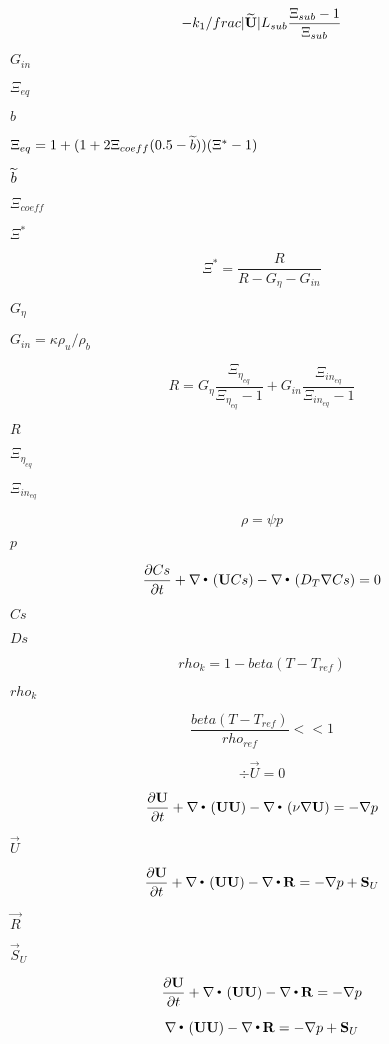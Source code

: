\documentclass{article}
\begin{document}
\[
    - k_{1} /frac{\vert \widetilde{\mathbf U} \vert}{L_{sub}}
    \frac{\Xi_{sub}-1}{\Xi_{sub}}
\]
\pagebreak

$ G_{in} $
\pagebreak

$\Xi_{eq}$
\pagebreak

$ b $
\pagebreak

$\Xi_{eq} = 1 + (1 + 2\Xi_{coeff}(0.5 - \widetilde{b}))(\Xi^* - 1)$
\pagebreak

$ \widetilde{b} $
\pagebreak

$ \Xi_{coeff} $
\pagebreak

$ \Xi^* $
\pagebreak

\[
        \Xi^* = \frac {R}{R - G_\eta - G_{in}}
    \]
\pagebreak

$ G_\eta $
\pagebreak

$ G_{in} = \kappa \rho_{u}/\rho_{b} $
\pagebreak

\[
        R = G_\eta \frac{\Xi_{\eta_{eq}}}{\Xi_{\eta_{eq}} - 1}
          + G_{in} \frac{\Xi_{{in}_{eq}}}{\Xi_{{in}_{eq}} - 1}
    \]
\pagebreak

$ R $
\pagebreak

$ \Xi_{\eta_{eq}} $
\pagebreak

$ \Xi_{{in}_{eq}} $
\pagebreak

\[
    \rho = \psi p
\]
\pagebreak

$        p     $
\pagebreak

\[
    \frac{\partial Cs}{\partial t } + \nabla\,{\scriptscriptstyle \stackrel{\bullet}{{}}}\, \left(\mathbf U Cs\right) - \nabla\,{\scriptscriptstyle \stackrel{\bullet}{{}}}\, \left(D_T \nabla Cs \right)
    = 0
\]
\pagebreak

$        Cs      $
\pagebreak

$        Ds      $
\pagebreak

\[
    rho_{k} = 1 - beta(T - T_{ref})
\]
\pagebreak

$ rho_{k} $
\pagebreak

\[
    \frac{beta(T - T_{ref})}{rho_{ref}} << 1
\]
\pagebreak

\[
        \div \vec{U} = 0
    \]
\pagebreak

\[
        \frac{\partial \mathbf U}{\partial t }
      + \nabla\,{\scriptscriptstyle \stackrel{\bullet}{{}}}\, \left( \mathbf U \mathbf U \right)
      - \nabla\,{\scriptscriptstyle \stackrel{\bullet}{{}}}\, \left(\nu \nabla \mathbf U \right)
      = - \nabla p
    \]
\pagebreak

$        \vec{U} $
\pagebreak

\[
        \frac{\partial \mathbf U}{\partial t } + \nabla\,{\scriptscriptstyle \stackrel{\bullet}{{}}}\, \left( \mathbf U \mathbf U \right) - \nabla\,{\scriptscriptstyle \stackrel{\bullet}{{}}}\, \mbox{\boldmath$\bf R$}
      = - \nabla p + \mathbf S_U
    \]
\pagebreak

$        \vec{R} $
\pagebreak

$        \vec{S}_U $
\pagebreak

\[
        \frac{\partial \mathbf U}{\partial t } + \nabla\,{\scriptscriptstyle \stackrel{\bullet}{{}}}\, \left( \mathbf U \mathbf U \right) - \nabla\,{\scriptscriptstyle \stackrel{\bullet}{{}}}\, \mbox{\boldmath$\bf R$}
      = - \nabla p
    \]
\pagebreak

\[
        \nabla\,{\scriptscriptstyle \stackrel{\bullet}{{}}}\, \left( \mathbf U \mathbf U \right) - \nabla\,{\scriptscriptstyle \stackrel{\bullet}{{}}}\, \mbox{\boldmath$\bf R$}
      = - \nabla p + \mathbf S_U
    \]
\pagebreak
\end{document}
